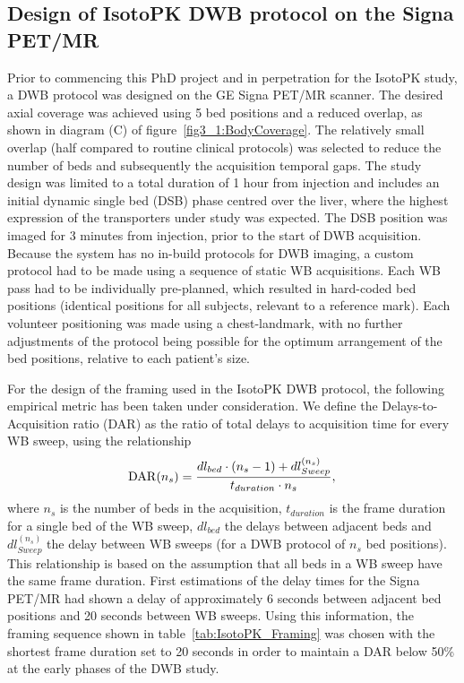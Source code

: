 \subsection{Design of IsotoPK DWB protocol on the Signa PET/MR}
Prior to commencing this PhD project and in perpetration for the IsotoPK study, a DWB protocol was designed on the GE Signa PET/MR scanner. The desired axial coverage was achieved using 5 bed positions and a reduced overlap, as shown in diagram (C) of figure~\ref{fig3_1:BodyCoverage}. The relatively small overlap (half compared to routine clinical protocols) was selected to reduce the number of beds and subsequently the acquisition temporal gaps.
The study design was limited to a total duration of 1 hour from injection and includes an initial dynamic single bed (DSB) phase centred over the liver, where the highest expression of the transporters under study was expected. 
The DSB position was imaged for 3 minutes from injection, prior to the start of DWB acquisition.
Because the system has no in-build protocols for DWB imaging, a custom protocol had to be made using a sequence of static WB acquisitions. Each WB pass had to be individually pre-planned, which resulted in hard-coded bed positions (identical positions for all subjects, relevant to a reference mark). Each volunteer positioning was made using a chest-landmark, with no further adjustments of the protocol being possible for the optimum arrangement of the bed positions, relative to each patient's size.

For the design of the framing used in the IsotoPK DWB protocol, the following empirical metric has been taken under consideration. We define the Delays-to-Acquisition ratio (DAR) as the ratio of total delays to acquisition time for every WB sweep, using the relationship
\begin{equation} \label{eqn:acq_to_dead_time}
 \mathrm{DAR}(n_s) = \frac{dl_{bed}\cdot (n_s-1) + dl_{Sweep}^{(n_s)}}{t_{duration}\cdot n_s }  \\ , \\ 
\end{equation}
where $n_s$ is the number of beds in the acquisition, $t_{duration}$ is the frame duration for a single bed of the WB sweep, $dl_{bed}$ the delays between adjacent beds and $dl_{Sweep}^{(n_s)}$ the delay between WB sweeps (for a DWB protocol of $n_s$ bed positions). This relationship is based on the assumption that all beds in a WB sweep have the same frame duration.
First estimations of the delay times for the Signa PET/MR had shown a delay of approximately 6 seconds between adjacent bed positions and 20 seconds between WB sweeps. Using this information, the framing sequence shown in table~\ref{tab:IsotoPK_Framing} was chosen with the shortest frame duration set to 20 seconds in order to maintain a DAR below 50\% at the early phases of the DWB study. 

